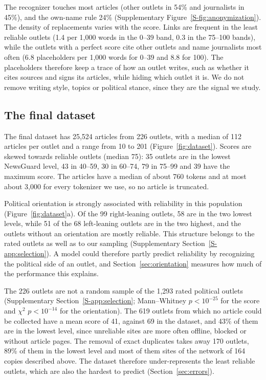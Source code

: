 \documentclass[11pt,a4paper]{article}
\begin{document}
The recognizer touches most articles (other outlets in 54\% and journalists in 45\%), and the own-name rule 24\%
(Supplementary Figure~\ref{S-fig:anonymization}). The density of replacements varies with the score. Links are frequent in the least reliable outlets (1.4 per 1,000 words in the 0--39 band, 0.3 in the 75--100 bands),
while the outlets with a perfect score cite other outlets and name journalists most often (6.8 placeholders per 1,000
words for 0--39 and 8.8 for 100). The placeholders therefore keep a trace of how an outlet writes, such as whether it cites sources and signs its
articles, while hiding which outlet it is. We do not remove writing style, topics or
political stance, since they are the signal we study.

\subsection{The final dataset}\label{sec:final}
The final dataset has 25,524 articles from 226 outlets, with a median of 112 articles per outlet and a range from 10 to
201 (Figure~\ref{fig:dataset}). Scores are skewed towards reliable outlets (median 75): 35 outlets are in the lowest
NewsGuard level, 43 in 40--59, 30 in 60--74, 79 in 75--99 and 39 have the maximum score. The articles have a median of
about 760 tokens and at most about 3,000 for every tokenizer we use, so no article is truncated.

Political orientation is strongly associated with reliability in this population (Figure~\ref{fig:dataset}a). Of the 99
right-leaning outlets, 58 are in the two lowest levels, while 51 of the 68 left-leaning outlets are in the two highest,
and the outlets without an orientation are mostly reliable. This structure belongs to the rated outlets as well as to
our sampling (Supplementary Section~\ref{S-app:selection}). A model could therefore partly predict reliability by
recognizing the political side of an outlet, and Section~\ref{sec:orientation} measures how much of the performance
this explains.

The 226 outlets are not a random sample of the 1,293 rated political outlets (Supplementary
Section~\ref{S-app:selection}; Mann--Whitney $p < 10^{-25}$ for the score and $\chi^2$ $p < 10^{-14}$ for the
orientation). The 619 outlets from which no article could be collected have a mean score of 41, against 69 in the
dataset, and 43\% of them are in the lowest level, since unreliable sites are more often offline, blocked or without
article pages. The removal of exact duplicates takes away 170 outlets, 89\% of them in the lowest level and most of them
sites of the network of 164 copies described above. The dataset therefore under-represents the least reliable outlets,
which are also the hardest to predict (Section~\ref{sec:errors}).
\end{document}
